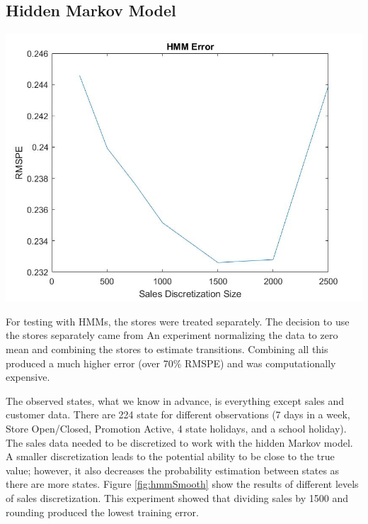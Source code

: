 \documentclass[twoside]{article}
\newenvironment{Figure}
{\par\medskip\noindent\minipage{\linewidth}}
{\endminipage\par\medskip}
\begin{document}
\begin{multicols}{2}
\begin{table}[H]
\begin{tabular}{lccr}
\bottomrule
\end{tabular}
\end{table}


\subsection{Hidden Markov Model}

\begin{Figure}
    \centering
    \includegraphics[width=\linewidth]{images/learningSmoothLabelHMM.jpg}
    \label{fig:hmmSmooth}
\end{Figure}

For testing with HMMs, the stores were treated separately. The decision to use the stores separately came from An experiment normalizing the data to zero mean and combining the stores to estimate transitions. Combining all this produced a much higher error (over 70\% RMSPE) and was computationally expensive.

The observed states, what we know in advance, is everything except sales and customer data. There are 224 state for different observations (7 days in a week, Store Open/Closed, Promotion Active, 4 state holidays, and a school holiday). The sales data needed to be discretized to work with the hidden Markov model. A smaller discretization leads to the potential ability to be close to the true value; however, it also decreases the probability estimation between states as there are more states. Figure \ref{fig:hmmSmooth} show the results of different levels of sales discretization. This experiment showed that dividing sales by 1500 and rounding produced the lowest training error.


\end{multicols}
\end{document}

